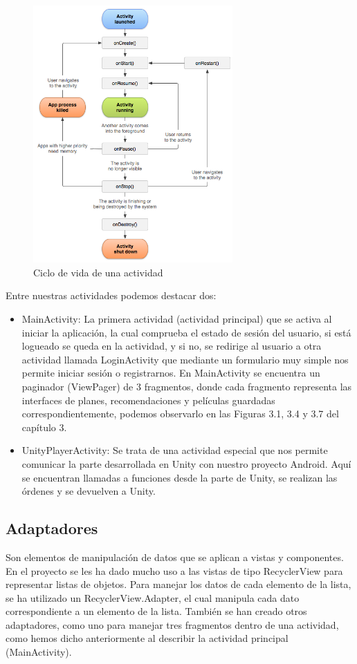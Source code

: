 \begin{figure}[H]
    \centering
    \includegraphics[width=3in]{figures/chapter-4/activity_lifecycle.png}
    \caption{Ciclo de vida de una actividad}
\end{figure}

Entre nuestras actividades podemos destacar dos: 
\begin{itemize}
    \item MainActivity: La primera actividad (actividad principal) que se activa al iniciar la aplicación, la cual comprueba el estado de sesión del usuario, si está logueado se queda en la actividad, y si no, se redirige al usuario a otra actividad llamada LoginActivity que mediante un formulario muy simple nos permite iniciar sesión o registrarnos. En MainActivity se encuentra un paginador (ViewPager) de 3 fragmentos, donde cada fragmento representa las interfaces de planes, recomendaciones y películas guardadas correspondientemente, podemos observarlo en las Figuras 3.1, 3.4 y 3.7 del capítulo 3.
    \item UnityPlayerActivity: Se trata de una actividad especial que nos permite comunicar la parte desarrollada en Unity con nuestro proyecto Android. Aquí se encuentran llamadas a funciones desde la parte de Unity, se realizan las órdenes y se devuelven a Unity.
\end{itemize} 

\subsection{Adaptadores}
\label{makereference4.3.2} 
Son elementos de manipulación de datos que se aplican a vistas y componentes. En el proyecto se les ha dado mucho uso a las vistas de tipo RecyclerView para representar listas de objetos. Para manejar los datos de cada elemento de la lista, se ha utilizado un RecyclerView.Adapter, el cual manipula cada dato correspondiente a un elemento de la lista. También se han creado otros adaptadores, como uno para manejar tres fragmentos dentro de una actividad, como hemos dicho anteriormente al describir la actividad principal (MainActivity).

